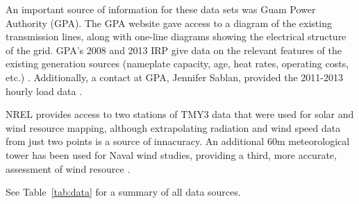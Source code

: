 \documentclass[12pt,letterpaper,fleqn]{article}
\begin{document}
An important source of information for these data sets was Guam Power
Authority (GPA). The GPA website gave access to a diagram of the
existing transmission lines, along with one-line diagrams showing the
electrical structure of the grid. GPA's 2008 and 2013 IRP give data on the
relevant features of the existing generation sources (nameplate
capacity, age, heat rates, operating costs, etc.) \cite{cruz08, cruz13}. Additionally, a
contact at GPA, Jennifer Sablan, provided the 2011-2013 hourly load
data \cite{sablan}.

NREL provides access to two stations of TMY3 data that were used for
solar and wind resource mapping, although extrapolating radiation and
wind speed data from just two points is a source of innacuracy. An
additional 60m meteorological tower has been used for Naval wind
studies, providing a third, more accurate, assessment of wind resource
\cite{nrel09}. 

See Table~\ref{tab:data} for a summary of all data sources.
\end{document}
